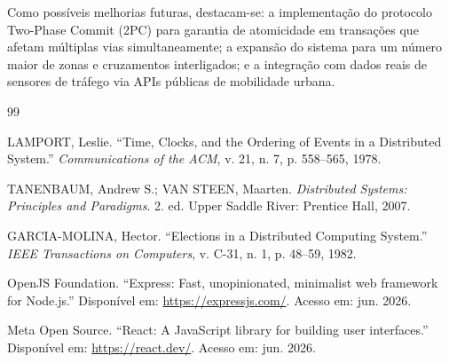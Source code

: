 \documentclass[12pt]{article}
\begin{document}
Como possíveis melhorias futuras, destacam-se: a implementação do protocolo Two-Phase Commit (2PC) para garantia de atomicidade em transações que afetam múltiplas vias simultaneamente; a expansão do sistema para um número maior de zonas e cruzamentos interligados; e a integração com dados reais de sensores de tráfego via APIs públicas de mobilidade urbana.


\begin{thebibliography}{99}

LAMPORT, Leslie. ``Time, Clocks, and the Ordering of Events in a Distributed System.'' \textit{Communications of the ACM}, v. 21, n. 7, p. 558--565, 1978.

TANENBAUM, Andrew S.; VAN STEEN, Maarten. \textit{Distributed Systems: Principles and Paradigms}. 2. ed. Upper Saddle River: Prentice Hall, 2007.

GARCIA-MOLINA, Hector. ``Elections in a Distributed Computing System.'' \textit{IEEE Transactions on Computers}, v. C-31, n. 1, p. 48--59, 1982.

OpenJS Foundation. ``Express: Fast, unopinionated, minimalist web framework for Node.js.'' Disponível em: \url{https://expressjs.com/}. Acesso em: jun. 2026.

Meta Open Source. ``React: A JavaScript library for building user interfaces.'' Disponível em: \url{https://react.dev/}. Acesso em: jun. 2026.

\end{thebibliography}
\end{document}
